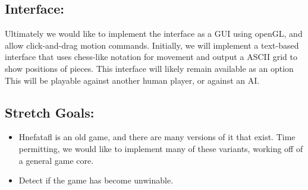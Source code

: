 \documentclass[11pt, oneside]{article}
\begin{document}
\subsection{Interface:}
Ultimately we would like to implement the interface as a GUI using openGL, and
allow click-and-drag motion commands. Initially, we will implement a text-based
interface that uses chess-like notation for movement and output a ASCII grid to
show positions of pieces. This interface will likely remain available as an
option\\
This will be playable against another human player, or against an AI.
\subsection{Stretch Goals:}
\begin{itemize}
\item Hnefatafl is an old game, and there are many versions of it that exist.
  Time permitting, we would like to implement many of these variants, working
  off of a general game core.
\item Detect if the game has become unwinable.
\end{itemize}
\end{document}
